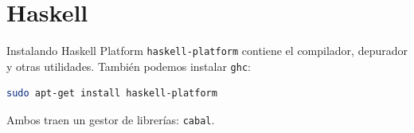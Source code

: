 \section{Haskell}

\begin{frame}[fragile]{Instalando Haskell Platform}
  \texttt{haskell-platform} contiene el compilador, depurador y otras utilidades.
  También podemos instalar \texttt{ghc}:
  \espacio
  \begin{lstlisting}[language=bash]
sudo apt-get install haskell-platform
  \end{lstlisting}
  \espacio
  Ambos traen un gestor de librerías: \texttt{cabal}.

\end{frame}


